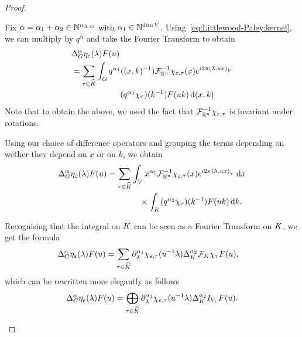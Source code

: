 \begin{proof}
\begin{description}
            Fix $\alpha = \alpha_1 + \alpha_2 \in \N^{\dimDifferenceOperators}$ with $\alpha_1 \in \N^{\dim \VectorSpace}$.
            Using~\eqref{eq:Littlewood-Paley:kernel},
            we can multiply by $q^\alpha$ and take the Fourier Transform to obtain
            \begin{align*}
                &\DifferenceOperatorOrder \alpha \eta_\epsilon(\lambda) F(u)\\
                &= \sum_{\tau \in \dualGroup \CompactGroup} \int_\Group
                q^{\alpha_1}((x, k)^{-1}) \InverseFourier [\R^n] \chi_{\epsilon, \tau}(x) \e^{\i \turn \ip \lambda {u x}}\\
                & \qquad \qquad \qquad (q^{\alpha_2} \chi_\tau)(k^{-1}) F(u k) \dd (x, k)
            \end{align*}
            Note that to obtain the above,
            we used the fact that $\InverseFourier [\R^n] \chi_{\epsilon, \tau}$ is invariant under rotations.

            Using our choice of difference operators and grouping the terms depending on
            wether they depend on $x$ or on $k$,
            we obtain
            \begin{align*}
                \DifferenceOperatorOrder \alpha \eta_\epsilon(\lambda) F(u)
                &= \sum_{\tau \in \dualGroup \CompactGroup}
                \int_\VectorSpace x^{\alpha_1} \InverseFourier [\R^n] \chi_{\epsilon, \tau}(x) \e^{\i \turn \ip \lambda {u x}} \dd x\\
                & \qquad \qquad \times \int_\CompactGroup (q^{\alpha_2} \chi_\tau)(k^{-1}) F(u k) \dd k.
            \end{align*}

            Recognising that the integral on $\CompactGroup$ can be seen as a Fourier Transform on $\CompactGroup$,
            we get the formula
            \begin{align*}
                \DifferenceOperatorOrder \alpha \eta_\epsilon(\lambda) F(u)
                &= \sum_{\tau \in \dualGroup \CompactGroup}
                \iD {\lambda^{\alpha_1} } \chi_{\epsilon, \tau}(u^{-1} \lambda)
                \DifferenceOperatorOrder [\CompactGroup] {\alpha_2} \Fourier [\CompactGroup] \chi_\tau F(u),
            \end{align*}
            which can be rewritten more elegantly as follows
            \begin{align}
                \DifferenceOperatorOrder \alpha \eta_\epsilon(\lambda) F(u)
                = \bigoplus_{\tau \in \dualGroup \CompactGroup}
                \iD {\lambda^{\alpha_1} } \chi_{\epsilon, \tau}(u^{-1} \lambda)
                \DifferenceOperatorOrder [\CompactGroup] {\alpha_2} \Id {V_\tau} F(u).
                \label{eq:Littlewood-Paley:difference_operators}
            \end{align}


\end{description}
\end{proof}
